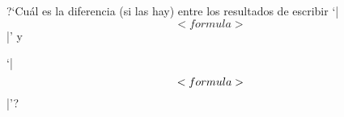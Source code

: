 

\bigskip

\enunciadoS ?`Cu\'al es la diferencia (si las hay) entre los
resultados de escribir `|$$<formula>$$|' y 

\noindent`|$$\hbox{$<formula>$}$$|'?

\bigskip


\bye

